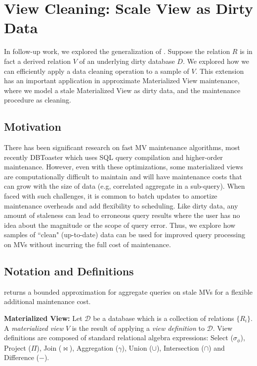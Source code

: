 \section{View Cleaning: Scale View as Dirty Data \cite{krishnan2015svc}}
In follow-up work, we explored the generalization of \sampleclean.
Suppose the relation $R$ is in fact a derived relation $V$ of an underlying dirty database $D$.
We explored how we can efficiently apply a data cleaning operation to a sample of $V$.
This extension has an important application in approximate Materialized View maintenance, where we model a stale Materialized View as dirty data, and the maintenance procedure as cleaning.  

\subsection{Motivation}
There has been significant research on fast MV maintenance algorithms, most recently DBToaster \cite{DBLP:journals/vldb/KochAKNNLS14} which uses SQL query compilation and higher-order maintenance.
However, even with these optimizations, some materialized views are computationally difficult to maintain and will have maintenance costs that can grow with the size of data (e.g, correlated aggregate in a sub-query).
When faced with such challenges, it is common to batch updates to amortize maintenance overheads and add flexibility to scheduling.
Like dirty data, any amount of staleness can lead to erroneous query results where the user has no idea about the magnitude or the scope of query error. 
Thus, we explore how samples of ``clean" (up-to-date) data can be used for improved query processing on MVs without incurring the full cost of maintenance.

\subsection{Notation and Definitions}\label{notation}
\svc returns a bounded approximation for aggregate queries on stale MVs for a flexible additional maintenance cost.

\noindent \textbf{Materialized View:} Let $\mathcal{D}$ be a database which is a collection of relations $\{R_i\}$. 
A \emph{materialized view} $V$ is the result of applying a \emph{view definition} to $\mathcal{D}$. 
View definitions are composed of standard relational algebra expressions: Select ($\sigma_{\phi}$), Project ($\Pi$), Join ($\bowtie$), Aggregation ($\gamma$), Union ($\cup$), Intersection ($\cap$) and Difference ($-$). 

